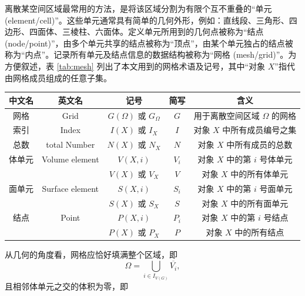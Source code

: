 离散某空间区域最常用的方法，是将该区域分割为有限个互不重叠的“单元 (element/cell)”。这些单元通常具有简单的几何外形，例如：直线段、三角形、四边形、四面体、三棱柱、六面体。定义单元所用到的几何点被称为“结点
(node/point)”，由多个单元共享的结点被称为“顶点”，由某个单元独占的结点被称为“内点”。记录所有单元及结点信息的数据结构被称为“网格
(mesh/grid)”。为方便叙述，表 \ref{tab:mesh} 列出了本文用到的网格术语及记号，其中“对象 $X$”指代由网格成员组成的任意子集。
\begin{table}
\centering{}\caption{\label{tab:mesh}网格术语及记号}
\begin{longtable}[c]{ccccc}
\toprule 
中文名 & 英文名 & 记号 & 简写 & 含义\tabularnewline
\midrule
网格 & Grid & $G(\varOmega)$ 或 $G_{\varOmega}$\nomenclature{$G(\varOmega)$ 或 $G_{\varOmega}$}{表示覆盖区域 $\varOmega$ 的网格}  & $G$ & 用于离散空间区域 $\varOmega$ 的网格\tabularnewline
索引 & Index & $I(X)$ 或 $I_{X}$\nomenclature{$I(X)$ 或 $I_{X}$}{表示对象 $X$ 中所有成员编号之集} & $I$ & 对象 $X$ 中所有成员编号之集\tabularnewline
总数 & total Number & $N(X)$ 或 $N_{X}$\nomenclature{$N(X)$ 或 $N_{X}$}{表示对象 $X$ 中所有成员的数量} & $N$ & 对象 $X$ 中所有成员的总数\tabularnewline
体单元 & Volume element & $V(X,i)$\nomenclature{$V(X,i)$ 或 $V_{i}$}{表示对象 $X$ 中的第 $i$ 号体单元} & $V_{i}$ & 对象 $X$ 中的第 $i$ 号体单元\tabularnewline
 &  & $V(X)$ 或 $V_{X}$\nomenclature{$V(X)$ 或 $V_{X}$}{表示对象 $X$ 中的所有体单元} & $V$ & 对象 $X$ 中的所有体单元\tabularnewline
面单元 & Surface element & $S(X,i)$\nomenclature{$S(X,i)$}{表示对象 $X$ 中的第 $i$ 号面单元} & $S_{i}$ & 对象 $X$ 中的第 $i$ 号面单元\tabularnewline
 &  & $S(X)$ 或 $S_{X}$\nomenclature{$S(X)$ 或 $S_{X}$}{表示对象 $X$ 中的所有面单元} & $S$ & 对象 $X$ 中的所有面单元\tabularnewline
结点 & Point & $P(X,i)$\nomenclature{$P(X,i)$}{表示对象 $X$ 中的第 $i$ 号结点} & $P_{i}$ & 对象 $X$ 中的第 $i$ 号结点\tabularnewline
 &  & $P(X)$ 或 $P_{X}$\nomenclature{$P(X)$ 或 $P_{X}$}{表示对象 $X$ 中的所有结点} & $P$ & 对象 $X$ 中的所有结点\tabularnewline
\bottomrule
\end{longtable}
\end{table}

从几何的角度看，网格应恰好填满整个区域，即
\begin{equation}
\varOmega=\bigcup_{i\in I_{V(G)}}\overline{V_{i}},
\end{equation}
且相邻体单元之交的体积为零，即

\newpage{}

